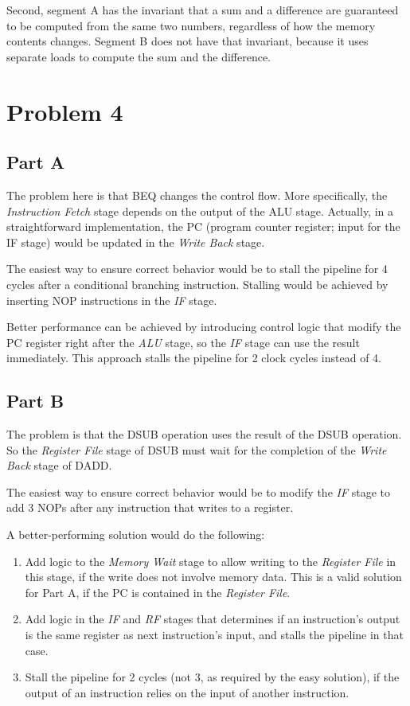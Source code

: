 Second, segment A has the invariant that a sum and a difference are guaranteed
to be computed from the same two numbers, regardless of how the memory contents
changes. Segment B does not have that invariant, because it uses separate loads
to compute the sum and the difference.

\section{Problem 4}

\subsection{Part A}
The problem here is that BEQ changes the control flow. More specifically, the
{\it Instruction Fetch} stage depends on the output of the ALU stage. Actually,
in a straightforward implementation, the PC (program counter register; input
for the IF stage) would be updated in the {\it Write Back} stage.

The easiest way to ensure correct behavior would be to stall the pipeline
for 4 cycles after a conditional branching instruction. Stalling would be
achieved by inserting NOP instructions in the {\it IF} stage.

Better performance can be achieved by introducing control logic that modify the
PC register right after the {\it ALU} stage, so the {\it IF} stage can use the
result immediately. This approach stalls the pipeline for 2 clock cycles
instead of 4.

\subsection{Part B}
The problem is that the DSUB operation uses the result of the DSUB operation.
So the {\it Register File} stage of DSUB must wait for the completion of the
{\it Write Back} stage of DADD.

The easiest way to ensure correct behavior would be to modify the {\it IF} stage
to add 3 NOPs after any instruction that writes to a register.

A better-performing solution would do the following:
\begin{enumerate}
\item Add logic to the {\it Memory Wait} stage to allow writing to the
{\it Register File} in this stage, if the write does not involve memory data.
This is a valid solution for Part A, if the PC is contained in the {\it Register
File}.
\item Add logic in the {\it IF} and {\it RF} stages that determines if an
instruction's output is the same register as next instruction's input, and
stalls the pipeline in that case.
\item Stall the pipeline for 2 cycles (not 3, as required by the easy solution),
if the output of an instruction relies on the input of another instruction.
\end{enumerate}

